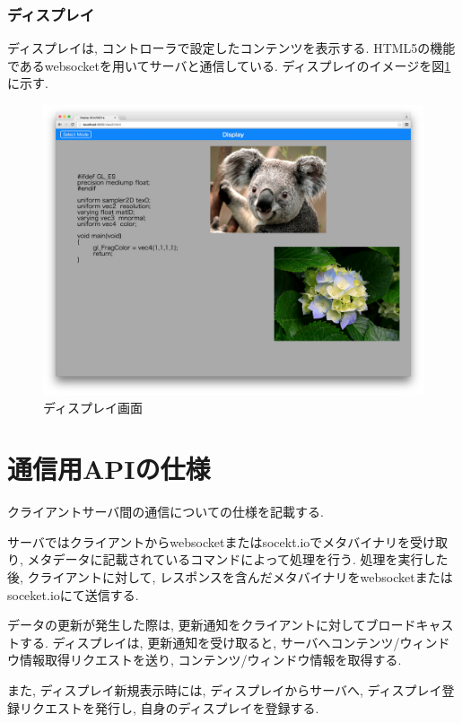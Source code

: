 \documentclass[a4paper,10pt,oneside]{jsbook}
\begin{document}
\subsection{ディスプレイ}
ディスプレイは, コントローラで設定したコンテンツを表示する. HTML5の機能であるwebsocketを用いてサーバと通信している. ディスプレイのイメージを図\ref{fig:display}に示す. 

\begin{figure}[htbp]
	\begin{center}
		\includegraphics[width=14.5cm]{image/display.png}
	\end{center}
	\caption{ディスプレイ画面}
	\label{fig:display}
\end{figure}

\chapter{通信用APIの仕様}
クライアントサーバ間の通信についての仕様を記載する.

サーバではクライアントからwebsocketまたはsocekt.ioでメタバイナリを受け取り, メタデータに記載されているコマンドによって処理を行う. 処理を実行した後, クライアントに対して, レスポンスを含んだメタバイナリをwebsocketまたはsoceket.ioにて送信する.

データの更新が発生した際は, 更新通知をクライアントに対してブロードキャストする.
ディスプレイは, 更新通知を受け取ると, サーバへコンテンツ/ウィンドウ情報取得リクエストを送り, コンテンツ/ウィンドウ情報を取得する.

また, ディスプレイ新規表示時には, ディスプレイからサーバへ, ディスプレイ登録リクエストを発行し, 自身のディスプレイを登録する.
\end{document}
